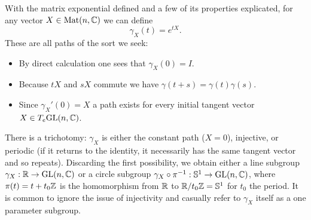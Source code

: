 With the matrix exponential defined and a few of its properties explicated, for any vector $X \in \operatorname{Mat}(n, \mathbb{C})$ we can define
\[
\gamma_X(t) = e^{tX}.
\]
These are all paths of the sort we seek:
\begin{itemize}
\item 
By direct calculation one sees that $\gamma_X(0) = I$.
\item 
Because $tX$ and $sX$ commute we have $\gamma(t+s) = \gamma(t)\gamma(s)$.
\item
Since $\gamma_X'(0) = X$ a path exists for every initial tangent vector $X \in T_e\mathrm{GL}(n,\mathbb{C})$.
\end{itemize}
There is a trichotomy: $\gamma_X$ is either the constant path ($X=0$), injective, or periodic (if it returns to the identity, it necessarily has the same tangent vector and so repeats).
Discarding the first possibility, we obtain either a line subgroup $\gamma_X : \mathbb{R} \to \mathrm{GL}(n,\mathbb{C})$ or a circle subgroup $\gamma_X \circ \pi^{-1} : \mathbb{S}^1 \to \mathrm{GL}(n,\mathbb{C})$, where $\pi(t) = t + t_0\mathbb{Z}$ is the homomorphism from $\mathbb{R}$ to $\mathbb{R}/t_0\mathbb{Z} = \mathbb{S}^1$ for $t_0$ the period.
It is common to ignore the issue of injectivity and casually refer to $\gamma_X$ itself as a one parameter subgroup.

